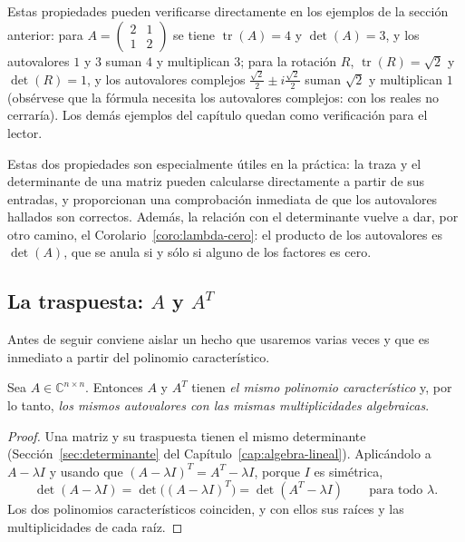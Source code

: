 Estas propiedades pueden verificarse directamente en los ejemplos de la sección anterior:
para $A = \begin{pmatrix}2&1\\1&2\end{pmatrix}$ se tiene $\operatorname{tr}(A)=4$ y
$\det(A)=3$, y los autovalores $1$ y $3$ suman $4$ y multiplican $3$; para la rotación
$R$, $\operatorname{tr}(R)=\sqrt2$ y $\det(R)=1$, y los autovalores complejos
$\frac{\sqrt2}{2}\pm i\frac{\sqrt2}{2}$ suman $\sqrt2$ y multiplican $1$ (obsérvese que
la fórmula necesita los autovalores complejos: con los reales no cerraría).
Los demás ejemplos del capítulo quedan como verificación para el lector.


Estas dos propiedades son especialmente útiles en la práctica: la traza y el determinante de una matriz pueden calcularse directamente a partir de sus entradas, y proporcionan una comprobación inmediata de que los autovalores hallados son correctos. Además, la relación con el determinante vuelve a dar, por otro camino, el
Corolario~\ref{coro:lambda-cero}: el producto de los autovalores es $\det(A)$, que se
anula si y sólo si alguno de los factores es cero.

\medskip

\subsection{La traspuesta: $A$ y $A^T$}

Antes de seguir conviene aislar un hecho que usaremos varias veces y que es inmediato a
partir del polinomio característico.

\begin{prop}\label{prop:autovalores-traspuesta}
Sea $A\in\mathbb{C}^{n\times n}$. Entonces $A$ y $A^T$ tienen \emph{el mismo polinomio
característico} y, por lo tanto, \emph{los mismos autovalores con las mismas
multiplicidades algebraicas}.
\end{prop}

\begin{proof}
Una matriz y su traspuesta tienen el mismo determinante (Sección~\ref{sec:determinante}
del Capítulo~\ref{cap:algebra-lineal}). Aplicándolo a $A-\lambda I$ y usando que
$(A-\lambda I)^T = A^T-\lambda I$, porque $I$ es simétrica,
\[
\det(A-\lambda I) = \det\big((A-\lambda I)^T\big) = \det(A^T-\lambda I)
\qquad\text{para todo }\lambda .
\]
Los dos polinomios característicos coinciden, y con ellos sus raíces y las
multiplicidades de cada raíz.
\end{proof}

